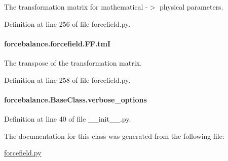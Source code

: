 The transformation matrix for mathematical -\/$>$ physical parameters. 



Definition at line 256 of file forcefield.\-py.

\hypertarget{classforcebalance_1_1forcefield_1_1FF_a3a288d2514106e171af1d0e31311f97a}{
\paragraph[{tm\-I}]{\setlength{\rightskip}{0pt plus 5cm}forcebalance.\-forcefield.\-F\-F.\-tm\-I}}\label{classforcebalance_1_1forcefield_1_1FF_a3a288d2514106e171af1d0e31311f97a}


The transpose of the transformation matrix. 



Definition at line 258 of file forcefield.\-py.

\hypertarget{classforcebalance_1_1BaseClass_afd68efa29ccd2f320f4cf82198214aac}{
\paragraph[{verbose\-\_\-options}]{\setlength{\rightskip}{0pt plus 5cm}forcebalance.\-Base\-Class.\-verbose\-\_\-options\hspace{0.3cm}{\ttfamily [inherited]}}}\label{classforcebalance_1_1BaseClass_afd68efa29ccd2f320f4cf82198214aac}


Definition at line 40 of file \-\_\-\-\_\-init\-\_\-\-\_\-.\-py.



The documentation for this class was generated from the following file\-:\begin{DoxyCompactItemize}
\item 
\hyperlink{forcefield_8py}{forcefield.\-py}\end{DoxyCompactItemize}
